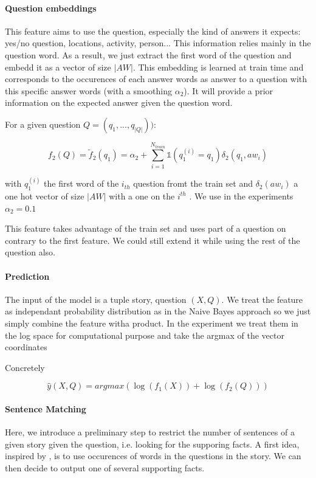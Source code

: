 \documentclass[paper=a4, fontsize=11pt]{scrartcl} %
\numberwithin{equation}{section} %
\numberwithin{figure}{section} %
\numberwithin{table}{section} %
\begin{document}
\paragraph{Question embeddings}

This feature aims to use the question, especially the kind of answers it expects: yes/no question, locations, activity, person... This information relies mainly in the question word. As a result, we just extract the first word of the question and embedd it as a vector of size $|AW|$. This embedding is learned at train time and corresponds to the occurences of each answer words as answer to a question with this specific answer words (with a smoothing $\alpha_2$). It will provide a prior information on the expected answer given the question word.

For a given question $Q = (q_1, ..., q_{|Q|}))$:

\[
f_2(Q) = \tilde{f}_2(q_1) = \alpha_2 + \sum_{i = 1}^{N_{train}} \mathbb{1}(q_1^{(i)}=q_1) \delta_2(q_1, aw_i)
\]

with $q_1^{(i)}$ the first word of the $i_{th}$ question fromt the train set and $\delta_2(aw_i)$ a one hot vector of size $|AW|$ with a one on the $i^{th}$ . We use in the experiments $\alpha_2 = 0.1$ 

This feature takes advantage of the train set and uses part of a question on contrary to the first feature. We could still extend it while using the rest of the question also. 

\paragraph{Prediction}

The input of the model is a tuple story, question $(X,Q)$. We treat the feature as independant probability distribution as in the Naive Bayes approach so we just simply combine the feature witha product. In the experiment we treat them in the log space for computational purpose and take the argmax of the vector coordinates

Concretely

\[
\hat{y}(X,Q) = argmax(\log(f_1(X)) + \log(f_2(Q)))
\]


\paragraph{Sentence Matching}

Here, we introduce a preliminary step to restrict the number of sentences of a given story given the question, i.e. looking for the supporing facts. A first idea, inspired by \cite{mct}, is to use occurences of words in the questions in the story. We can then decide to output one of several supporting facts.
\end{document}
